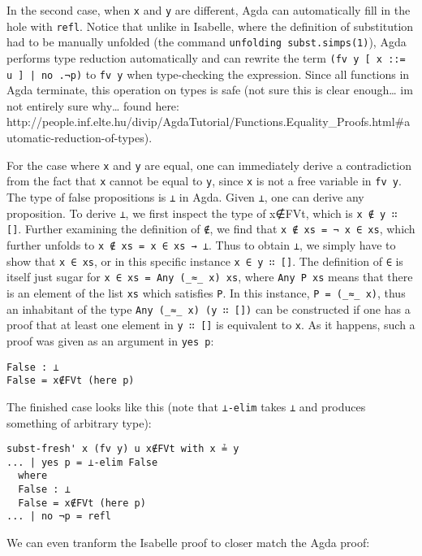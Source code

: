 \documentclass[a4paper, 12pt, twoside]{style/ociamthesis}
\theoremstyle{plain}
\theoremstyle{definition}
\theoremstyle{remark}
\begin{document}
In the second case, when \texttt{x} and \texttt{y} are different, Agda
can automatically fill in the hole with \texttt{refl}. Notice that
unlike in Isabelle, where the definition of substitution had to be
manually unfolded (the command \texttt{unfolding subst.simps(1)}), Agda
performs type reduction automatically and can rewrite the term
\texttt{(fv y [ x ::= u ] | no .¬p)} to \texttt{fv y} when type-checking
the expression. Since all functions in Agda terminate, this operation on
types is safe (not sure this is clear enough\ldots{} im not entirely
sure why\ldots{} found here:
http://people.inf.elte.hu/divip/AgdaTutorial/Functions.Equality\_Proofs.html\#automatic-reduction-of-types).

For the case where \texttt{x} and \texttt{y} are equal, one can
immediately derive a contradiction from the fact that \texttt{x} cannot
be equal to \texttt{y}, since \texttt{x} is not a free variable in
\texttt{fv y}. The type of false propositions is \texttt{⊥} in Agda.
Given \texttt{⊥}, one can derive any proposition. To derive \texttt{⊥},
we first inspect the type of x∉FVt, which is \texttt{x ∉ y ∷ []}.
Further examining the definition of \texttt{∉}, we find that
\texttt{x ∉ xs = ¬ x ∈ xs}, which further unfolds to
\texttt{x ∉ xs = x ∈ xs → ⊥}. Thus to obtain \texttt{⊥}, we simply have
to show that \texttt{x ∈ xs}, or in this specific instance
\texttt{x ∈ y ∷ []}. The definition of \texttt{∈} is itself just sugar
for \texttt{x ∈ xs = Any (\_≈\_ x) xs}, where \texttt{Any P xs} means
that there is an element of the list \texttt{xs} which satisfies
\texttt{P}. In this instance, \texttt{P = (\_≈\_ x)}, thus an inhabitant
of the type \texttt{Any (\_≈\_ x) (y ∷ [])} can be constructed if one
has a proof that at least one element in \texttt{y ∷ []} is equivalent
to \texttt{x}. As it happens, such a proof was given as an argument in
\texttt{yes p}:

\begin{verbatim}
False : ⊥
False = x∉FVt (here p)
\end{verbatim}

The finished case looks like this (note that \texttt{⊥-elim} takes
\texttt{⊥} and produces something of arbitrary type):

\begin{verbatim}
subst-fresh' x (fv y) u x∉FVt with x ≟ y
... | yes p = ⊥-elim False
  where
  False : ⊥
  False = x∉FVt (here p)
... | no ¬p = refl
\end{verbatim}

We can even tranform the Isabelle proof to closer match the Agda proof:
\end{document}
